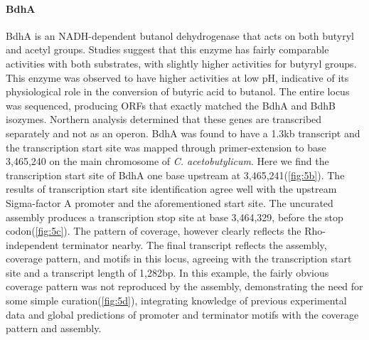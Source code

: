 \paragraph{BdhA}
BdhA is an NADH-dependent butanol dehydrogenase that acts on both butyryl and acetyl groups. Studies suggest that this enzyme has fairly comparable activities with both substrates, with slightly higher activities for butyryl groups\cite{71}. This enzyme was observed to have higher activities at low pH, indicative of its physiological role in the conversion of butyric acid to butanol. The entire locus was sequenced, producing ORFs that exactly matched the BdhA and BdhB isozymes\cite{73}. Northern analysis determined that these genes are transcribed separately and not as an operon. BdhA was found to have a 1.3kb transcript and the transcription start site was mapped through primer-extension to base 3,465,240 on the main chromosome of \textit{C. acetobutylicum}\cite{73}. Here we find the transcription start site of BdhA one base upstream at 3,465,241(\ref{fig:5b}). The results of transcription start site identification agree well with the upstream Sigma-factor A promoter and the aforementioned start site. The uncurated assembly produces a transcription stop site at base 3,464,329, before the stop codon(\ref{fig:5c}). The pattern of coverage, however clearly reflects the Rho-independent terminator nearby. The final transcript reflects the assembly, coverage pattern, and motifs in this locus, agreeing with the transcription start site and a transcript length of 1,282bp. In this example, the fairly obvious coverage pattern was not reproduced by the assembly, demonstrating the need for some simple curation(\ref{fig:5d}), integrating knowledge of previous experimental data and global predictions of promoter and terminator motifs with the coverage pattern and assembly.
